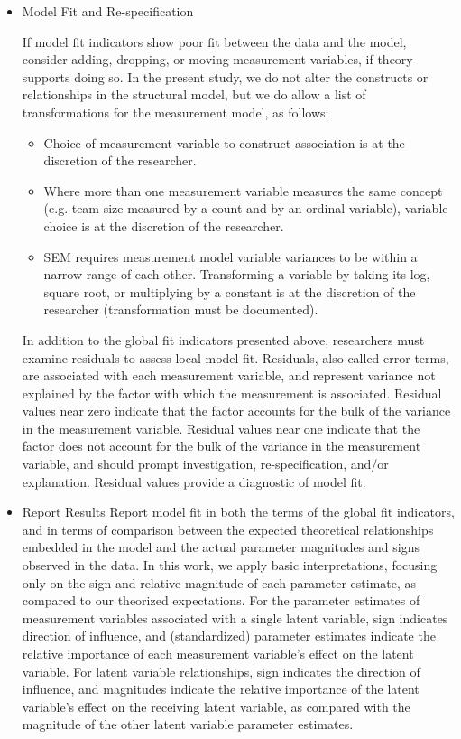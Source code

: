 \begin{itemize}
\item Model Fit and Re-specification

If model fit indicators show poor fit between the data and the model, consider adding, dropping, or moving measurement variables, if theory supports doing so. In the present study, we do not alter the constructs or relationships in the structural model, but we do allow a list of transformations for the measurement model, as follows:
\begin{itemize}
	\item Choice of measurement variable to construct association is at the discretion of the researcher. 
	\item Where more than one measurement variable measures the same concept (e.g. team size measured by a count and by an ordinal variable), variable choice is at the discretion of the researcher. 
	\item SEM requires measurement model variable variances to be within a narrow range of each other. Transforming a variable by taking its log, square root, or multiplying by a constant is at the discretion of the researcher (transformation must be documented).
\end{itemize} 

In addition to the global fit indicators presented above, researchers must examine residuals to assess local model fit. Residuals, also called error terms, are associated with each measurement variable, and represent variance not explained by the factor with which the measurement is associated. Residual values near zero indicate that the factor accounts for the bulk of the variance in the measurement variable. Residual values near one indicate that the factor does not account for the bulk of the variance in the measurement variable, and should prompt investigation, re-specification, and/or explanation. Residual values provide a diagnostic of model fit.

\item Report Results
Report model fit in both the terms of the global fit indicators, and in terms of comparison between the expected theoretical relationships embedded in the model and the actual parameter magnitudes and signs observed in the data. In this work, we apply basic interpretations, focusing only on the sign and relative magnitude of each parameter estimate, as compared to our theorized expectations. For the parameter estimates of measurement variables associated with a single latent variable, sign indicates direction of influence, and (standardized) parameter estimates indicate the relative importance of each measurement variable's effect on the latent variable. For latent variable relationships, sign indicates the direction of influence, and magnitudes indicate the relative importance of the latent variable's effect on the receiving latent variable, as compared with the magnitude of the other latent variable parameter estimates.

\end{itemize}
